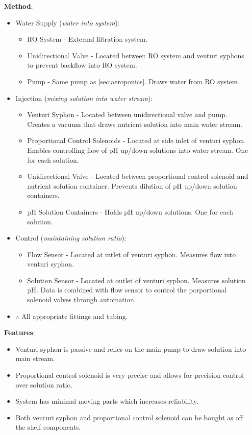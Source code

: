 \documentclass{report}
\begin{document}
\textbf{Method}:
\begin{itemize}
    \item Water Supply (\textit{water into system}):
    \begin{itemize}
        \item RO System - External filtration system. 
        \item Unidirectional Valve - Located between RO system and venturi syphons to prevent backflow into RO system.
        \item Pump - Same pump as \ref{sec:aeroponics}. Draws water from RO system.
    \end{itemize}
    \item Injection (\textit{mixing solution into water stream}):
    \begin{itemize}
        \item Venturi Syphon - Located between unidirectional valve and pump. Creates a vacuum that draws nutrient solution into main water stream.
        \item Proportional Control Solenoids - Located at side inlet of venturi syphon. Enables controlling flow of pH up/down solutions into water stream. One for each solution.
        \item Unidirectional Valve - Located between proportional control solenoid and nutrient solution container. Prevents dilution of pH up/down solution containers.
        \item pH Solution Containers - Holds pH up/down solutions. One for each solution.
    \end{itemize}
    \item Control (\textit{maintaining solution ratio}):
    \begin{itemize}
        \item Flow Sensor - Located at intlet of venturi syphon. Measures flow into venturi syphon.
        \item Solution Sensor - Located at outlet of venturi syphon. Measures solution pH. Data is combined with flow sensor to control the porportional solenoid valves through automation.
    \end{itemize}
    \item $\therefore$ All appropriate fittings and tubing.
\end{itemize}

\textbf{Features}:
\begin{itemize}
    \item Venturi syphon is passive and relies on the main pump to draw solution into main stream.
    \item Proportional control solenoid is very precise and allows for precision control over solution ratio.
    \item System has minimal moving parts which increases reliability.
    \item Both venturi syphon and proportional control solenoid can be bought as off the shelf components.
\end{itemize}
\end{document}
